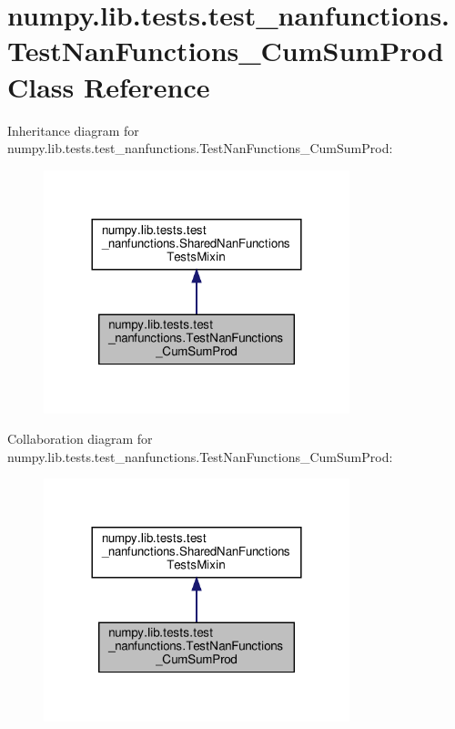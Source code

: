 \hypertarget{classnumpy_1_1lib_1_1tests_1_1test__nanfunctions_1_1TestNanFunctions__CumSumProd}{}\section{numpy.\+lib.\+tests.\+test\+\_\+nanfunctions.\+Test\+Nan\+Functions\+\_\+\+Cum\+Sum\+Prod Class Reference}
\label{classnumpy_1_1lib_1_1tests_1_1test__nanfunctions_1_1TestNanFunctions__CumSumProd}


Inheritance diagram for numpy.\+lib.\+tests.\+test\+\_\+nanfunctions.\+Test\+Nan\+Functions\+\_\+\+Cum\+Sum\+Prod\+:
\nopagebreak
\begin{figure}[H]
\begin{center}
\leavevmode
\includegraphics[width=252pt]{classnumpy_1_1lib_1_1tests_1_1test__nanfunctions_1_1TestNanFunctions__CumSumProd__inherit__graph}
\end{center}
\end{figure}


Collaboration diagram for numpy.\+lib.\+tests.\+test\+\_\+nanfunctions.\+Test\+Nan\+Functions\+\_\+\+Cum\+Sum\+Prod\+:
\nopagebreak
\begin{figure}[H]
\begin{center}
\leavevmode
\includegraphics[width=252pt]{classnumpy_1_1lib_1_1tests_1_1test__nanfunctions_1_1TestNanFunctions__CumSumProd__coll__graph}
\end{center}
\end{figure}
